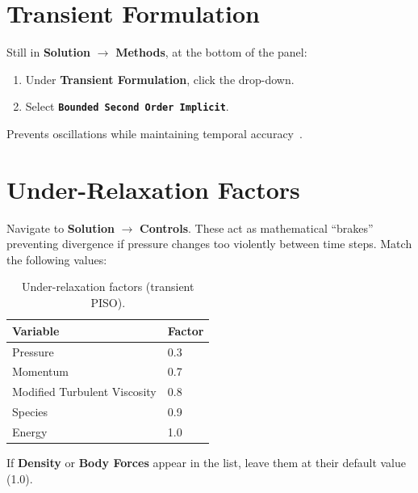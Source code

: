 \documentclass[12pt,a4paper]{report}
\begin{document}
\medskip
\noindent{}

\section{Transient Formulation}

Still in \textbf{Solution} $\rightarrow$ \textbf{Methods}, at the
bottom of the panel:

\begin{enumerate}
  \item Under \textbf{Transient Formulation}, click the drop-down.
  \item Select \textbf{\texttt{Bounded Second Order Implicit}}.
\end{enumerate}

\noindent Prevents oscillations while maintaining temporal
accuracy~\cite{Menter2012}.

\section{Under-Relaxation Factors}

Navigate to \textbf{Solution} $\rightarrow$ \textbf{Controls}.  These
act as mathematical ``brakes'' preventing divergence if pressure changes
too violently between time steps.  Match the following values:

\begin{table}[H]
\centering
\caption{Under-relaxation factors (transient PISO).}
\label{tab:urf}
\begin{tabular}{@{}ll@{}}
\toprule
\textbf{Variable} & \textbf{Factor} \\
\midrule
Pressure                    & 0.3 \\
Momentum                    & 0.7 \\
Modified Turbulent Viscosity & 0.8 \\
Species                     & 0.9 \\
Energy                      & 1.0 \\
\bottomrule
\end{tabular}
\end{table}

\noindent If \textbf{Density} or \textbf{Body Forces} appear in the
list, leave them at their default value (1.0).
\end{document}
